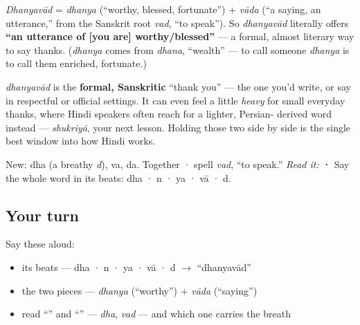 \begin{cousinweb}
\emph{Dhanyavād} = \emph{dhanya} (\textquotedblleft{}worthy, blessed, fortunate\textquotedblright{}) + \emph{vāda} (\textquotedblleft{}a saying, an utterance,\textquotedblright{} from the Sanskrit root \textbf{} \emph{vad}, \textquotedblleft{}to speak\textquotedblright{}). So \emph{dhanyavād} literally offers \textbf{\textquotedblleft{}an utterance of {[}you are{]} worthy/blessed\textquotedblright{}} — a formal, almost literary way to say thanks. (\emph{dhanya} comes from \emph{dhana}, \textquotedblleft{}wealth\textquotedblright{} — to call someone \emph{dhanya} is to call them enriched, fortunate.)
\end{cousinweb}

\begin{culture}
\emph{dhanyavād} is the \textbf{formal, Sanskritic} \textquotedblleft{}thank you\textquotedblright{} — the one you'd write, or say in respectful or official settings. It can even feel a little \emph{heavy} for small everyday thanks, where Hindi speakers often reach for a lighter, Persian- derived word instead — \emph{shukriyā}, your next lesson. Holding those two side by side is the single best window into how Hindi works.
\end{culture}

\begin{sounds}
New:  dha (a breathy \emph{d}),  va,  da. Together · spell \emph{vad}, \textquotedblleft{}to speak.\textquotedblright{} \emph{Read it:} \textbf{·} Say the whole word in its beats: dha · n · ya · vā · d.
\end{sounds}

\subsection*{Your turn}
Say these aloud:

\begin{itemize}
\raggedright
  \item its beats — dha · n · ya · vā · d $\to$ \textquotedblleft{}dhanyavād\textquotedblright{}
  \item the two pieces — \emph{dhanya} (\textquotedblleft{}worthy\textquotedblright{}) + \emph{vāda} (\textquotedblleft{}saying\textquotedblright{})
  \item read \textquotedblleft{}\textquotedblright{} and \textquotedblleft{}\textquotedblright{} — \emph{dha}, \emph{vad} — and which one carries the breath
\end{itemize}

